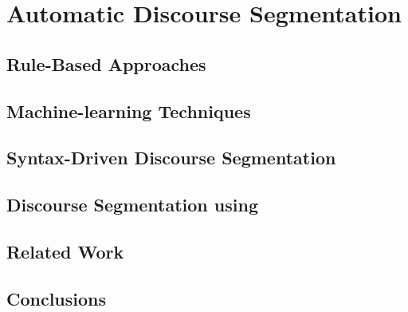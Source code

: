 \chapter{Automatic Discourse Segmentation}
\section{Rule-Based Approaches}
\section{Machine-learning Techniques}
\section{Syntax-Driven Discourse Segmentation}
\section{Discourse Segmentation using}
\section{Related Work}
\section{Conclusions}
